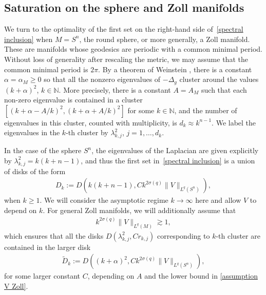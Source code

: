 \documentclass[12pt]{amsart}
\newcommand{\N}{{\mathbb N}}
\begin{document}
\subsection{Saturation on the sphere and Zoll manifolds}
We turn to the optimality of the first set on the right-hand side of~\eqref{spectral inclusion} when $M =S^n$, the round sphere, or more generally, a Zoll manifold. These are manifolds whose geodesics are periodic with a common minimal period. Without loss of generality after rescaling the metric, we may assume that
the common minimal period is $2\pi$. By a theorem of Weinstein
\cite{MR482878}, there is a constant $\alpha=\alpha_M\geq 0$
so that all the nonzero eigenvalues of $-\Delta_g$ cluster around the values $(k+\alpha)^2$, $k\in\N$. More precisely, 
there is a constant $A=A_M$ such that each non-zero eigenvalue is contained in a cluster $[(k+\alpha-A/k)^2,(k+\alpha+A/k)^2]$ for some $k\in\N$, and the number of eigenvalues in this cluster, counted with multiplicity, is $d_k\approx k^{n-1}$. We label the eigenvalues in the $k$-th cluster by $\lambda_{k,j}^2$, $j=1,\ldots,d_k$. 

In the case of the sphere $S^n$, the eigenvalues of the Laplacian are given explicitly by $\lambda_{k,j}^2 = k(k+n-1)$, and thus the first set in~\eqref{spectral inclusion} is a union of disks of the form
\begin{align}\label{D_k sphere}
D_k := D(k(k+n-1),Ck^{2\sigma(q)} \|V\|_{L^q(S^n)}),
\end{align}
when $k\geq 1$. We will consider the asymptotic regime $k\to\infty$ here and allow $V$ to depend on $k$. For general Zoll manifolds, we will additionally assume that 
\begin{align}\label{assumption V Zoll}
k^{2\sigma(q)} \|V\|_{L^q(M)}\gtrsim 1,   
\end{align}
which ensures that all the disks $D(\lambda_{k,j}^2,Cr_{k,j})$ corresponding to $k$-th cluster are contained in the larger disk
\begin{align}\label{D_k tilde Zoll}
    \tilde{D}_k := D((k+\alpha)^2,Ck^{2\sigma(q)} \|V\|_{L^q(S^n)}),
\end{align}
for some larger constant $C$, depending on $A$ and the lower bound in \eqref{assumption V Zoll}.
\end{document}
